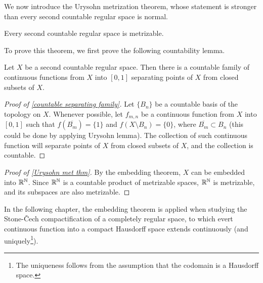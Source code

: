 We now introduce the Urysohn metrization theorem, whose statement is stronger than every second countable regular space is normal.
\begin{thm}\label{Urysohn met thm}
    Every second countable regular space is metrizable.
\end{thm}
To prove this theorem, we first prove the following countability lemma.
\begin{lem}\label{countable separating family}
    Let $X$ be a second countable regular space.
    Then there is a countable family of continuous functions from $X$ into $[0, 1]$ separating points of $X$ from closed subsets of $X$.
\end{lem}
\begin{proof}[Proof of \cref{countable separating family}]
    Let $\{B_n\}$ be a countable basis of the topology on $X$.
    Whenever possible, let $f_{m, n}$ be a continuous function from $X$ into $[0, 1]$ such that $f(\overline{B_m})=\{1\}$ and $f(X\setminus B_n)=\{0\}$, where $\overline{B_m}\subset B_n$ (this could be done by applying Urysohn lemma).
    The collection of such continuous function will separate points of $X$ from closed subsets of $X$, and the collection is countable.
\end{proof}
\begin{proof}[Proof of \cref{Urysohn met thm}]
    By the embedding theorem, $X$ can be embedded into ${\mathbb{R}}^{\mathbb{N}}$.
    Since ${\mathbb{R}}^{\mathbb{N}}$ is a countable product of metrizable spaces, ${\mathbb{R}}^{\mathbb{N}}$ is metrizable, and its subspaces are also metrizable.
\end{proof}

In the following chapter, the embedding theorem is applied when studying the Stone-\v{C}ech compactification of a completely regular space, to which evert continuous function into a compact Hausdorff space extends continuously (and uniquely\footnote{The uniqueness follows from the assumption that the codomain is a Hausdorff space.}).